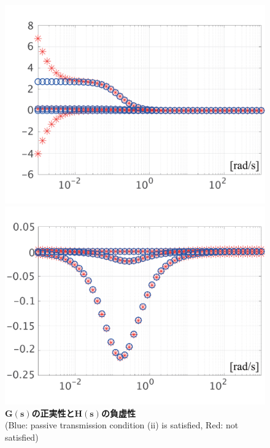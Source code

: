 \documentclass[graybox, envcountchap]{svmult}
\begin{document}
\begin{figure}[t]
  \centering
  {
  \begin{minipage}{0.49\linewidth}
    \centering
    \includegraphics[width = 1.0\linewidth]{figs/eigG}
    \medskip
  \end{minipage}
  \begin{minipage}{0.49\linewidth}
    \centering
    \includegraphics[width = 1.0\linewidth]{figs/eigH}
    \medskip
  \end{minipage}
  }
  \medskip
  \caption{\textbf{$\bm{G(s)}$の正実性と$\bm{H(s)}$の負虚性}
  \\  \centering(Blue: passive transmission condition (ii) is satisfied, Red: not satisfied)}
  \label{fig:eigGH}
\medskip
\end{figure}
\end{document}
